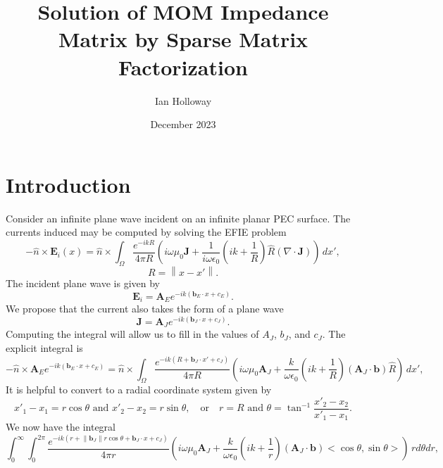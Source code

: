 \documentclass{article}
\title{Solution of MOM Impedance Matrix by Sparse Matrix Factorization}
\author{Ian Holloway}
\date{December 2023}
\newcommand{\norm}[1]{\left\lVert #1 \right\rVert}
\theoremstyle{plain}
\begin{document}
\maketitle

\section{Introduction}\label{sec_intro}

Consider an infinite plane wave incident on an infinite planar PEC surface.
The currents induced may be computed by solving the EFIE problem
\begin{equation}
	-\hat{n}\times\mathbf{E}_i(x) = \hat{n}\times\int_\Omega \frac{e^{-ikR}}{4\pi R}
	\left( i\omega\mu_0\mathbf{J} 
	+ \frac{1}{i\omega\epsilon_0}\left( ik + \frac{1}{R} \right) \hat{R} (\nabla\cdot\mathbf{J}) \right) \,dx',
\end{equation}
\begin{equation}
	R = \norm{x-x'}.
\end{equation}
The incident plane wave is given by
\begin{equation}
	\mathbf{E}_i = \mathbf{A}_Ee^{-ik(\mathbf{b}_E\cdot x + c_E)}.
\end{equation}
We propose that the current also takes the form of a plane wave
\begin{equation}
	\mathbf{J} = \mathbf{A}_Je^{-ik(\mathbf{b}_J\cdot x + c_J)}.
\end{equation}
Computing the integral will allow us to fill in the values of $A_J$, $b_J$, and $c_J$.
The explicit integral is
\begin{equation}
	-\hat{n}\times\mathbf{A}_Ee^{-ik(\mathbf{b}_E\cdot x + c_E)}
	= \hat{n}\times\int_\Omega \frac{e^{-ik(R+\mathbf{b}_J\cdot x' + c_J)}}{4\pi R}
	\left( i\omega\mu_0 \mathbf{A}_J
	+ \frac{k}{\omega\epsilon_0}\left( ik + \frac{1}{R} \right)(\mathbf{A}_J\cdot\mathbf{b}) \hat{R} \right) \,dx',
\end{equation}
It is helpful to convert to a radial coordinate system given by
\begin{equation}
	x'_1-x_1 = r\cos{\theta} \text{ and } x'_2-x_2 = r\sin{\theta}, \quad\text{or}\quad r = R \text{ and } \theta = \tan^{-1}{\frac{x'_2 - x_2}{x'_1 - x_1}}.
\end{equation}
We now have the integral
\begin{equation}
	\int_0^\infty \int_0^{2\pi} \frac{e^{-ik(r+\norm{\mathbf{b}_J}r\cos{\theta} + \mathbf{b}_J\cdot x + c_J)}}{4\pi r}
	\left( i\omega\mu_0 \mathbf{A}_J
	+ \frac{k}{\omega\epsilon_0}\left( ik + \frac{1}{r} \right)(\mathbf{A}_J\cdot\mathbf{b}) <\cos{\theta},\sin{\theta}> \right) \,rd\theta dr,
\end{equation}
\end{document}
